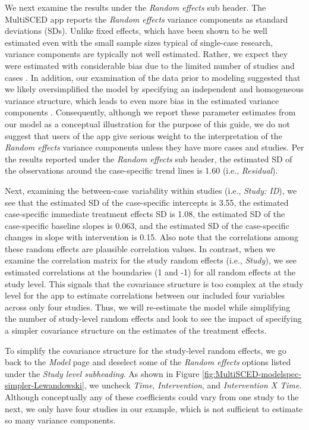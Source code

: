 \documentclass[
]{book}
\begin{document}
We next examine the results under the \emph{Random effects} sub header. The MultiSCED app reports the \emph{Random effects} variance components as standard deviations (SDs). Unlike fixed effects, which have been shown to be well estimated even with the small sample sizes typical of single-case research, variance components are typically not well estimated. Rather, we expect they were estimated with considerable bias due to the limited number of studies and cases \citep{Moeyaert_Ugille_Ferron_Beretvas_VandenNoortgate_2013, Owens_Ferron_2012}. In addition, our examination of the data prior to modeling suggested that we likely oversimplified the model by specifying an independent and homogeneous variance structure, which leads to even more bias in the estimated variance components \citep{Joo_et_al_2019}. Consequently, although we report these parameter estimates from our model as a conceptual illustration for the purpose of this guide, we do not suggest that users of the app give serious weight to the interpretation of the \emph{Random effects} variance components unless they have more cases and studies. Per the results reported under the \emph{Random effects} sub header, the estimated SD of the observations around the case-specific trend lines is 1.60 (i.e., \emph{Residual}).

Next, examining the between-case variability within studies (i.e., \emph{Study: ID}), we see that the estimated SD of the case-specific intercepts is 3.55, the estimated case-specific immediate treatment effects SD is 1.08, the estimated SD of the case-specific baseline slopes is 0.063, and the estimated SD of the case-specific changes in slope with intervention is 0.15. Also note that the correlations among these random effects are plausible correlation values. In contrast, when we examine the correlation matrix for the study random effects (i.e., \emph{Study}), we see estimated correlations at the boundaries (1 and -1) for all random effects at the study level. This signals that the covariance structure is too complex at the study level for the app to estimate correlations between our included four variables across only four studies. Thus, we will re-estimate the model while simplifying the number of study-level random effects and look to see the impact of specifying a simpler covariance structure on the estimates of the treatment effects.

To simplify the covariance structure for the study-level random effects, we go back to the \emph{Model} page and deselect some of the \emph{Random effects} options listed under the \emph{Study level subheading}. As shown in Figure \ref{fig:MultiSCED-modelspec-simpler-Lewandowski}, we uncheck \emph{Time}, \emph{Intervention}, and \emph{Intervention X Time}. Although conceptually any of these coefficients could vary from one study to the next, we only have four studies in our example, which is not sufficient to estimate so many variance components.
\end{document}
